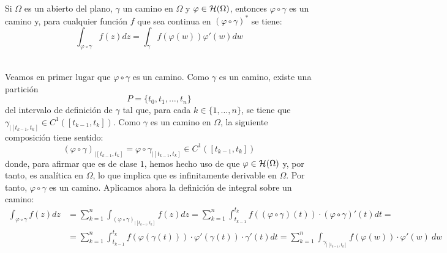 \begin{ejercicio}\label{ej:8.11}
    Si $\Omega$ es un abierto del plano, $\gamma$ un camino en $\Omega$ y $\varphi \in \mathcal{H}(\Omega)$, entonces $\varphi \circ \gamma$ es un camino y, para cualquier función $f$ que sea continua en $(\varphi\circ \gamma)^*$ se tiene:
    \begin{equation*}
        \int_{\varphi\circ\gamma} f(z)dz = \int_{\gamma} f(\varphi(w)) \varphi'(w)dw
    \end{equation*}~

    Veamos en primer lugar que $\varphi\circ\gamma$ es un camino. Como $\gamma$ es un camino, existe una partición
    \begin{equation*}
        P=\{t_0,t_1,\ldots,t_n\}
    \end{equation*}
    del intervalo de definición de $\gamma$ tal que, para cada $k\in \{1,\dots,n\}$, se tiene que $\gamma_{\big| [t_{k-1},t_k]}\in C^1([t_{k-1},t_k])$. Como $\gamma$ es un camino en $\Omega$, la siguiente composición tiene sentido:
    \begin{equation*}
        \left(\varphi\circ\gamma\right)_{\big| [t_{k-1},t_k]} = \varphi\circ\gamma_{\big| [t_{k-1},t_k]}\in C^1([t_{k-1},t_k])
    \end{equation*}
    donde, para afirmar que es de clase $1$, hemos hecho uso de que $\varphi\in \mathcal{H}(\Omega)$ y, por tanto, es analítica en $\Omega$, lo que implica que es infinitamente derivable en $\Omega$. Por tanto, $\varphi\circ\gamma$ es un camino. Aplicamos ahora la definición de integral sobre un camino:
    \begin{align*}
        \int_{\varphi\circ\gamma} f(z)dz &= \sum_{k=1}^{n} \int_{\left(\varphi\circ\gamma\right)_{\big| [t_{k-1},t_k]}} f(z)dz = \sum_{k=1}^{n} \int_{t_{k-1}}^{t_k} f\left((\varphi\circ\gamma)(t)\right) \cdot \left(\varphi\circ\gamma\right)'(t)dt
        =\\&= \sum_{k=1}^{n} \int_{t_{k-1}}^{t_k} f\left(\varphi(\gamma(t))\right) \cdot \varphi'(\gamma(t))\cdot \gamma'(t)dt
        = \sum_{k=1}^{n} \int_{\gamma_{\big| [t_{k-1},t_k]}} f\left(\varphi(w)\right) \cdot \varphi'(w)\ dw
    \end{align*}
\end{ejercicio}

